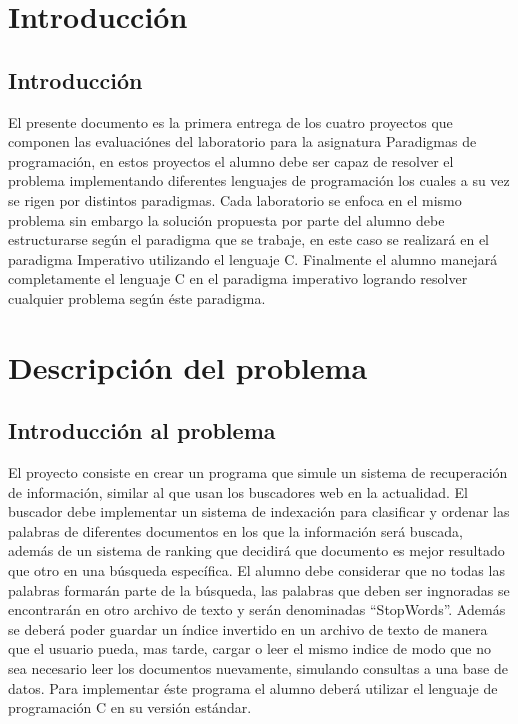 \documentclass[letterpaper,12pt]{report}
\begin{document}
\tableofcontents

\chapter{Introducci\'on}

\section {Introducci\'on}

El presente documento es la primera entrega de los cuatro proyectos que componen las evaluaciónes del laboratorio para la asignatura Paradigmas de programación, en estos proyectos el alumno debe ser capaz de resolver el problema implementando diferentes lenguajes de programación los cuales a su vez se rigen por distintos paradigmas. Cada laboratorio se enfoca en el mismo problema sin embargo la solución propuesta por parte del alumno debe estructurarse según el paradigma que se trabaje, en este caso se realizará en el paradigma Imperativo utilizando el lenguaje C. Finalmente el alumno manejará completamente el lenguaje C en el paradigma imperativo logrando resolver cualquier problema según éste paradigma.

\chapter{Descripci\'on del problema}

\section {Introducci\'on al problema}

El proyecto consiste en crear un programa que simule un sistema de recuperación de información, similar al que usan los buscadores web en la actualidad. El buscador debe implementar un sistema de indexación para clasificar y ordenar las palabras de diferentes documentos en los que la información será buscada, además de un sistema de ranking que decidirá que documento es mejor resultado que otro en una búsqueda específica. El alumno debe considerar que no todas las palabras formarán parte de la búsqueda, las palabras que deben ser ingnoradas se encontrarán en otro archivo de texto y serán denominadas ``StopWords''. Además se deberá poder guardar un índice invertido en un archivo de texto de manera que el usuario pueda, mas tarde, cargar o leer el mismo indice de modo que no sea necesario leer los documentos nuevamente, simulando consultas a una base de datos. Para implementar éste programa el alumno deberá utilizar el lenguaje de programación C en su versión estándar.
\end{document}
